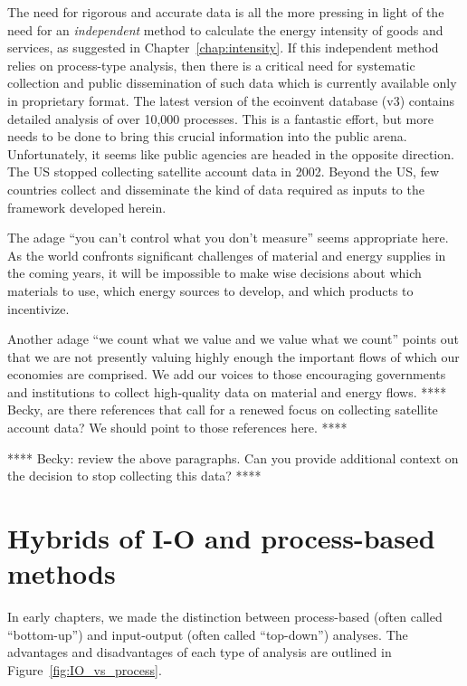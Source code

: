The need for rigorous and accurate data
is all the more pressing in light of the need for
an \emph{independent} method to calculate
the energy intensity of goods and services,
as suggested in Chapter~\ref{chap:intensity}.
If this independent method relies on process-type
analysis,
then there is a critical need for systematic
collection and public dissemination of such data
which is currently available only in proprietary format.
The latest version of the ecoinvent database (v3)
contains detailed analysis of over 10,000 
processes.\cite{EcoInvent2012}
This is a fantastic effort, but more needs to be
done to bring this crucial information into the public arena.
Unfortunately, it seems like public agencies are headed in the
opposite direction.
The US stopped collecting 
satellite account data in 2002. 
Beyond the US, few countries collect and disseminate
the kind of data required as inputs to the framework
developed herein.

The adage ``you can't control what you don't measure''
seems appropriate here. 
As the world confronts significant challenges
of material and energy supplies in the coming years,
it will be impossible to make wise decisions about
which materials to use,
which energy sources to develop, and 
which products to incentivize.

Another adage ``we count what we value and we value what we count''
points out that we are not presently valuing highly enough
the important flows of which our economies are comprised.
We add our voices to those encouraging governments and 
institutions to collect high-quality data on material 
and energy flows.
**** Becky, are there references that call for a renewed focus on 
collecting satellite account data? 
We should point to those references here. ****
 
**** Becky: review the above paragraphs.
Can you provide additional context on the decision
to stop collecting this data? ****

\section{Hybrids of I-O and process-based methods}
\label{sec:hybrid}

In early chapters,
we made the distinction between
process-based (often called ``bottom-up'') 
and input-output (often called ``top-down'')
analyses.
The advantages and disadvantages of each type
of analysis are outlined in Figure~\ref{fig:IO_vs_process}.

